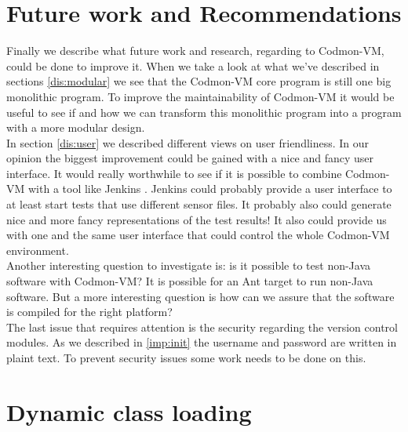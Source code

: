 \documentclass{article}
\newcommand{\project}{Codmon-VM}
\begin{document}
\newpage
\section{Future work and Recommendations}
\label{sec:future}
Finally we describe what future work and research, regarding to \project{}, could be done to improve it. When we take a look at what we've described in sections \ref{dis:modular}
we see that the \project{} core program is still one big monolithic program. To improve the maintainability of \project{} it would be useful to see if and how we can transform this monolithic 
program into a program with a more modular design.\\

\noindent In section \ref{dis:user} we described different views on user friendliness. In our opinion the biggest improvement could be gained with a nice and fancy user interface. It would 
really worthwhile to see if it is possible to combine \project{} with a tool like Jenkins \cite{JenkinsDoc}. Jenkins could probably provide a user interface to at least start tests that use 
different sensor files. It probably also could generate nice and more fancy representations of the test results! It also could provide us with one and the same user interface that could control the whole \project{} 
environment.\\

\noindent Another interesting question to investigate is: is it possible to test non-Java software with \project{}? It is possible for an Ant target to run non-Java software. But a more interesting 
question is how can we assure that the software is compiled for the right platform?\\

\noindent The last issue that requires attention is the security regarding the version control modules. As we described in \ref{imp:init} the username and password are written in plaint text. To prevent 
security issues some work needs to be done on this.

\newpage

\newpage
\appendix
\section{Dynamic class loading}
\label{AppendixA}
\end{document}
